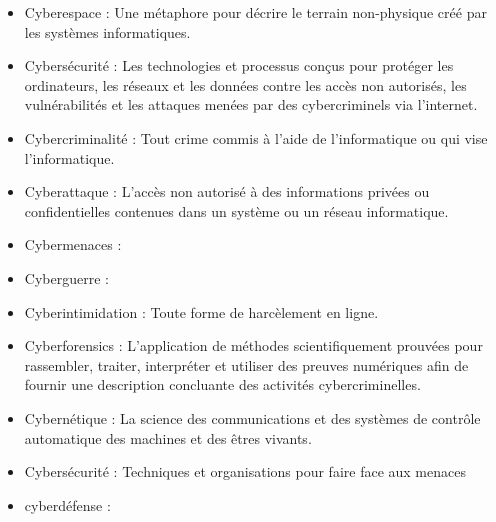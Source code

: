 \begin{itemize}

	\item  Cyberespace : Une métaphore pour décrire le terrain non-physique créé par les systèmes informatiques.
	\item Cybersécurité : Les technologies et processus conçus pour protéger les ordinateurs, les réseaux et les données contre les accès non autorisés, les vulnérabilités et les attaques menées par des cybercriminels via l'internet.
	\item Cybercriminalité : Tout crime commis à l'aide de l'informatique ou qui vise l'informatique.
	\item Cyberattaque : L'accès non autorisé à des informations privées ou confidentielles contenues dans un système ou un réseau informatique.
	\item Cybermenaces :
	\item Cyberguerre : 
	\item Cyberintimidation : Toute forme de harcèlement en ligne.
	\item Cyberforensics : L'application de méthodes scientifiquement prouvées pour rassembler, traiter, interpréter et utiliser des preuves numériques afin de fournir une description concluante des activités cybercriminelles.
	\item Cybernétique : La science des communications et des systèmes de contrôle automatique des machines et des êtres vivants.
	\item Cybersécurité : Techniques et organisations pour faire face aux menaces
	\item cyberdéfense : 

\end{itemize}




